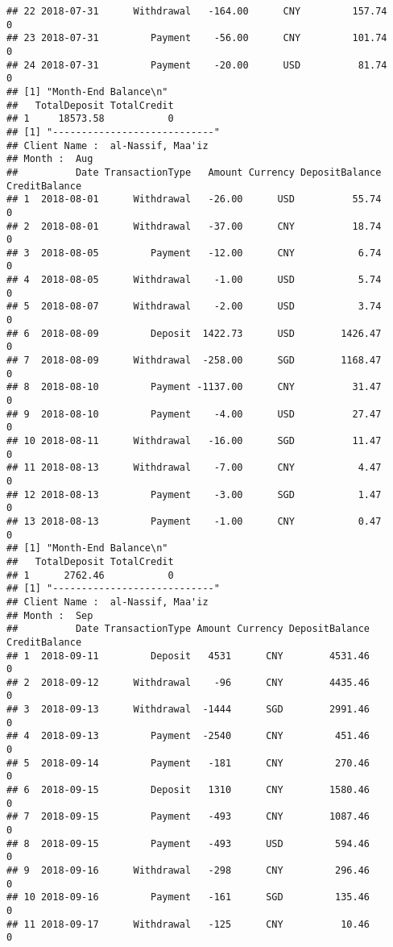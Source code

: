\documentclass[]{article}
\begin{document}
\begin{verbatim}
## 22 2018-07-31      Withdrawal   -164.00      CNY         157.74             0
## 23 2018-07-31         Payment    -56.00      CNY         101.74             0
## 24 2018-07-31         Payment    -20.00      USD          81.74             0
## [1] "Month-End Balance\n"
##   TotalDeposit TotalCredit
## 1     18573.58           0
## [1] "----------------------------"
## Client Name :  al-Nassif, Maa'iz 
## Month :  Aug 
##          Date TransactionType   Amount Currency DepositBalance CreditBalance
## 1  2018-08-01      Withdrawal   -26.00      USD          55.74             0
## 2  2018-08-01      Withdrawal   -37.00      CNY          18.74             0
## 3  2018-08-05         Payment   -12.00      CNY           6.74             0
## 4  2018-08-05      Withdrawal    -1.00      USD           5.74             0
## 5  2018-08-07      Withdrawal    -2.00      USD           3.74             0
## 6  2018-08-09         Deposit  1422.73      USD        1426.47             0
## 7  2018-08-09      Withdrawal  -258.00      SGD        1168.47             0
## 8  2018-08-10         Payment -1137.00      CNY          31.47             0
## 9  2018-08-10         Payment    -4.00      USD          27.47             0
## 10 2018-08-11      Withdrawal   -16.00      SGD          11.47             0
## 11 2018-08-13      Withdrawal    -7.00      CNY           4.47             0
## 12 2018-08-13         Payment    -3.00      SGD           1.47             0
## 13 2018-08-13         Payment    -1.00      CNY           0.47             0
## [1] "Month-End Balance\n"
##   TotalDeposit TotalCredit
## 1      2762.46           0
## [1] "----------------------------"
## Client Name :  al-Nassif, Maa'iz 
## Month :  Sep 
##          Date TransactionType Amount Currency DepositBalance CreditBalance
## 1  2018-09-11         Deposit   4531      CNY        4531.46             0
## 2  2018-09-12      Withdrawal    -96      CNY        4435.46             0
## 3  2018-09-13      Withdrawal  -1444      SGD        2991.46             0
## 4  2018-09-13         Payment  -2540      CNY         451.46             0
## 5  2018-09-14         Payment   -181      CNY         270.46             0
## 6  2018-09-15         Deposit   1310      CNY        1580.46             0
## 7  2018-09-15         Payment   -493      CNY        1087.46             0
## 8  2018-09-15         Payment   -493      USD         594.46             0
## 9  2018-09-16      Withdrawal   -298      CNY         296.46             0
## 10 2018-09-16         Payment   -161      SGD         135.46             0
## 11 2018-09-17      Withdrawal   -125      CNY          10.46             0

\end{verbatim}
\end{document}
